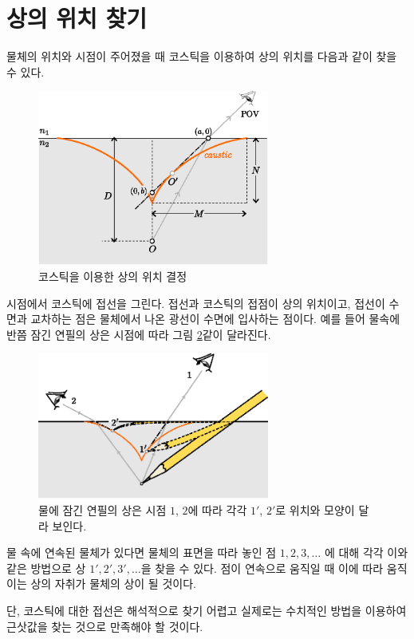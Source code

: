 \documentclass[twocolumn]{article}
\begin{document}
\section{상의 위치 찾기}
물체의 위치와 시점이 주어졌을 때 코스틱을 이용하여 상의 위치를 다음과 같이 찾을 수 있다.

\begin{figure}[ht]
	\centering
	\includegraphics[width=3in]{figs/g394.eps}
	\caption{코스틱을 이용한 상의 위치 결정}
	\label{fig:image_caustic}
\end{figure}

시점에서 코스틱에 접선을 그린다. 접선과 코스틱의 접점이 상의 위치이고, 접선이 수면과 
교차하는 점은 물체에서 나온 광선이 수면에 입사하는 점이다. 
예를 들어 물속에 반쯤 잠긴 연필의 상은 시점에 따라 그림 \ref{fig:pencil_view}\과 같이 달라진다.
\begin{figure}[ht]
	\centering
	\includegraphics[width=3in]{figs/g43.eps}
	\caption{물에 잠긴 연필의 상은 시점 $1$, $2$에 따라 각각 $1'$, $2'$로 위치와 모양이 달라 보인다.}
	\label{fig:pencil_view}
\end{figure}

물 속에 연속된 물체가 있다면 물체의 표면을 따라 놓인 점 $1, 2, 3, \dots$ 에 대해 
각각 이와 같은 방법으로 상 $1', 2', 3', \dots$을 찾을 수 있다. 점이 연속으로 움직일 때 이에 따라 움직이는 상의 자취가 
물체의 상이 될 것이다.

단, 코스틱에 대한 접선은 해석적으로 찾기 어렵고 실제로는 수치적인 방법을 이용하여 
근삿값을 찾는 것으로 만족해야 할 것이다.
\end{document}
